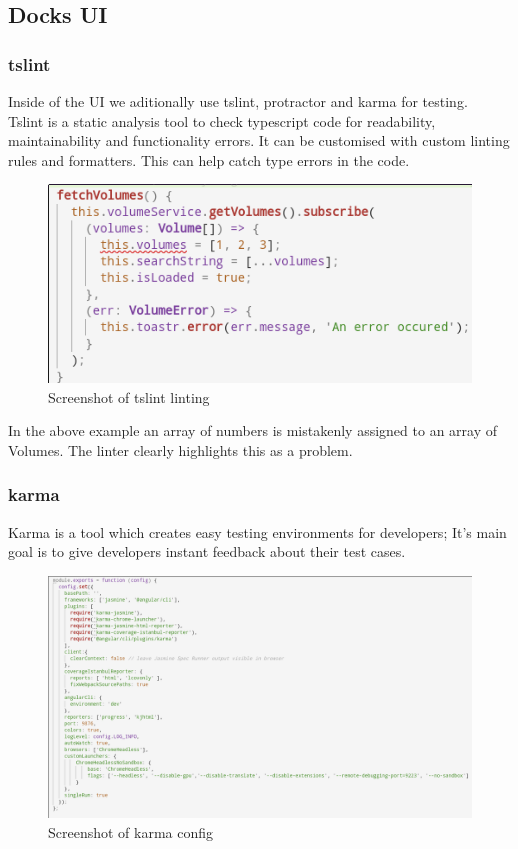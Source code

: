 \documentclass[]{article}
\begin{document}
\subsection{Docks UI}

\subsubsection{tslint}
Inside of the UI we aditionally use tslint, protractor and karma for testing.
\\
Tslint is a static analysis tool to check typescript code for readability, maintainability and functionality errors.
It can be customised with custom linting rules and formatters.
This can help catch type errors in the code.
\begin{figure}[H]
	\centering
	\includegraphics[scale=0.5]{tslint_error.png}
	\caption{Screenshot of tslint linting}
\end{figure}

In the above example an array of numbers is mistakenly assigned to an array of Volumes. 
The linter clearly highlights this as a problem.

\pagebreak

\subsubsection{karma}
Karma is a tool which creates easy testing environments for developers; It's main goal 
is to give developers instant feedback about their test cases.
\begin{figure}[H]
	\centering
	\includegraphics[scale=0.5]{karma.png}
	\caption{Screenshot of karma config}
\end{figure}
\end{document}
